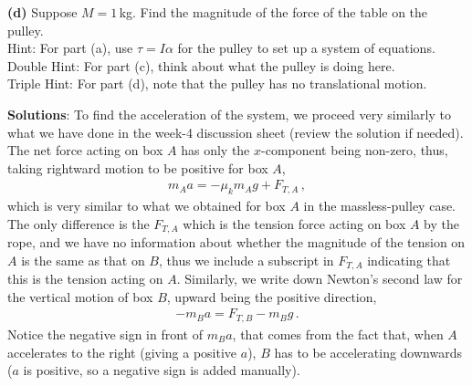 \documentclass[11pt]{article}
\begin{document}
\noindent \textbf{(d)} Suppose $M=1$\,kg. Find the magnitude of the force of the table on the pulley. \\

\vfill
\noindent Hint:
\color{gray}
For part (a), use $\tau = I \alpha$ for the pulley to set up a system of equations. 
\color{black}\\
\noindent Double Hint:
\color{gray}
For part (c), think about what the pulley is doing here. 
\color{black}\\
\noindent Triple Hint:
\color{gray}
For part (d), note that the pulley has no translational motion.
\color{black}


\newpage
\textbf{Solutions}: To find the acceleration of the system, we proceed very similarly to what we have done in the week-4 discussion sheet (review the solution if needed). The net force acting on box $A$ has only the $x$-component being non-zero, thus, taking rightward motion to be positive for box $A$,
\begin{align*}
m_A a = -\mu_k m_A g +F_{T,A}\,,
\end{align*}
which is very similar to what we obtained for box $A$ in the massless-pulley case. The only difference is the $F_{T,A}$ which is the tension force acting on box $A$ by the rope, and we have no information about whether the magnitude of the tension on $A$ is the same as that on $B$, thus we include a subscript in $F_{T,A}$ indicating that this is the tension acting on $A$. Similarly, we write down Newton's second law for the vertical motion of box $B$, upward being the positive direction,
\begin{align*}
 -m_B a = F_{T,B} - m_B g \,.
\end{align*}
Notice the negative sign in front of $m_{B}a$, that comes from the fact that, when $A$ accelerates to the right (giving a positive $a$), $B$ has to be accelerating downwards ($a$ is positive, so a negative sign is added manually). \\
\end{document}
